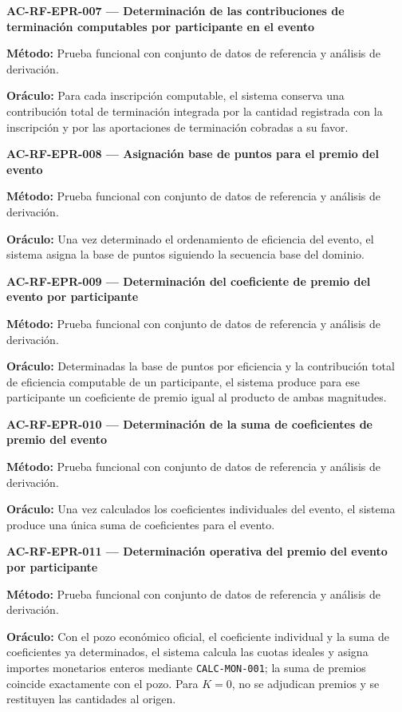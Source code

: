 \documentclass[10pt,letterpaper]{article}
\begin{document}
\noindent\textbf{AC-RF-EPR-007 --- Determinación de las contribuciones de terminación computables por participante en el evento}\par
\textbf{Método:} Prueba funcional con conjunto de datos de referencia y análisis de derivación.\par
\textbf{Oráculo:} Para cada inscripción computable, el sistema conserva una contribución total de terminación integrada por la cantidad registrada con la inscripción y por las aportaciones de terminación cobradas a su favor.\par\vspace{0.45em}
\noindent\textbf{AC-RF-EPR-008 --- Asignación base de puntos para el premio del evento}\par
\textbf{Método:} Prueba funcional con conjunto de datos de referencia y análisis de derivación.\par
\textbf{Oráculo:} Una vez determinado el ordenamiento de eficiencia del evento, el sistema asigna la base de puntos siguiendo la secuencia base del dominio.\par\vspace{0.45em}
\noindent\textbf{AC-RF-EPR-009 --- Determinación del coeficiente de premio del evento por participante}\par
\textbf{Método:} Prueba funcional con conjunto de datos de referencia y análisis de derivación.\par
\textbf{Oráculo:} Determinadas la base de puntos por eficiencia y la contribución total de eficiencia computable de un participante, el sistema produce para ese participante un coeficiente de premio igual al producto de ambas magnitudes.\par\vspace{0.45em}
\noindent\textbf{AC-RF-EPR-010 --- Determinación de la suma de coeficientes de premio del evento}\par
\textbf{Método:} Prueba funcional con conjunto de datos de referencia y análisis de derivación.\par
\textbf{Oráculo:} Una vez calculados los coeficientes individuales del evento, el sistema produce una única suma de coeficientes para el evento.\par\vspace{0.45em}
\noindent\textbf{AC-RF-EPR-011 --- Determinación operativa del premio del evento por participante}\par
\textbf{Método:} Prueba funcional con conjunto de datos de referencia y análisis de derivación.\par
\textbf{Oráculo:} Con el pozo económico oficial, el coeficiente individual y la suma de coeficientes ya determinados, el sistema calcula las cuotas ideales y asigna importes monetarios enteros mediante \texttt{CALC-MON-001}; la suma de premios coincide exactamente con el pozo. Para $K=0$, no se adjudican premios y se restituyen las cantidades al origen.\par\vspace{0.45em}
\end{document}
